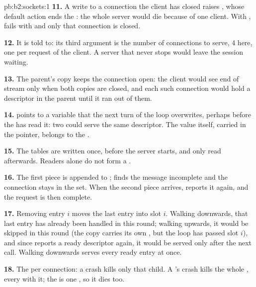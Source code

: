 \begin{solution}{pb:b2:sockets:1}
\textbf{11.} A write to a connection the client has closed raises , whose default action ends the
: the whole server would die because of one client. With ,  fails with
 and only that connection is closed.

\textbf{12.} It is told to: its third argument is the number of connections to serve, 4 here, one per request of the
client. A server that never stops would leave the session waiting.

\textbf{13.} The parent's copy keeps the connection open: the client would see end of stream only when both copies
are closed, and each such connection would hold a descriptor in the parent until it ran out of them.

\textbf{14.}  points to a variable that the next turn of the loop overwrites, perhaps before the  has
read it: two  could serve the same descriptor. The value itself, carried in the pointer, belongs to the
.

\textbf{15.} The tables are written once, before the server starts, and only read afterwards. Readers alone do not
form a .

\textbf{16.} The first piece is appended to ;  finds the message incomplete and the
connection stays in the set. When the second piece arrives,  reports it again, and the request is then
complete.

\textbf{17.} Removing entry $i$ moves the last entry into slot $i$. Walking downwards, that last entry has already been
handled in this round; walking upwards, it would be skipped in this round (the copy carries its own , but the loop has
passed slot $i$), and since  reports a ready descriptor again, it would be served only after the next
call. Walking downwards serves every ready entry at once.

\textbf{18.} The  per connection: a crash kills only that child. A 's crash kills the whole , every
 with it; the  is one , so it dies too.


\end{solution}
